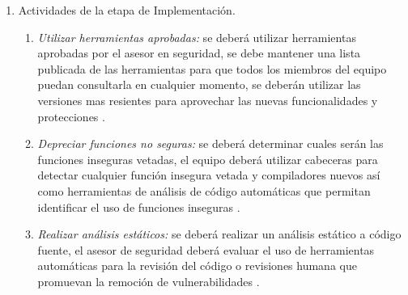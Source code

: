 \documentclass[runningheads,a4paper]{llncs}
\begin{document}
\begin{enumerate}
\item Actividades de la etapa de Implementación.
\\
\begin{enumerate}
	\item \textit{Utilizar herramientas aprobadas: }se deberá utilizar herramientas aprobadas por el asesor en seguridad, se debe mantener una lista publicada de las herramientas para que todos los miembros del equipo puedan consultarla en cualquier momento, se deberán utilizar las versiones mas resientes para aprovechar las nuevas funcionalidades y protecciones \cite{SDLWhitePaper}. \\
	
	\item \textit{Depreciar funciones no seguras: }se deberá determinar cuales serán las funciones inseguras vetadas, el equipo deberá utilizar cabeceras para detectar cualquier función insegura vetada y compiladores nuevos así como herramientas de análisis de código automáticas que permitan identificar el uso de funciones inseguras \cite{SDLWhitePaper}. \\
	
	\item \textit{Realizar análisis estáticos: }se deberá realizar un análisis estático a código fuente, el asesor de seguridad deberá evaluar el uso de herramientas automáticas para la revisión del código o revisiones humana que promuevan la remoción de vulnerabilidades \cite{SDLWhitePaper}.   
\\
\end{enumerate}


\end{enumerate}
\end{document}
